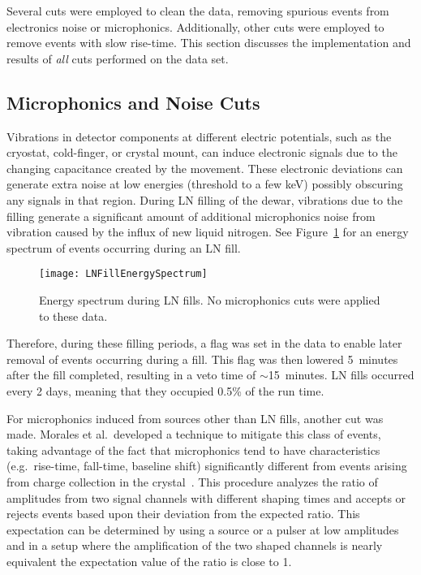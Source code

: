 	Several cuts were employed to clean the data, removing spurious events from electronics noise or microphonics.  Additionally, other cuts were employed to remove events with slow rise-time.  This section discusses the implementation and results of \emph{all} cuts performed on the data set.  
	
		\subsection{Microphonics and Noise Cuts}
	     	\label{sec:MicroCuts}	
	
	Vibrations in detector components at different electric potentials, such as the cryostat, cold-finger, or crystal mount, can induce electronic signals due to the changing capacitance created by the movement.  These electronic deviations can generate extra noise at low energies (threshold to a few keV) possibly obscuring any signals in that region.  During LN filling of the dewar, vibrations due to the filling generate a significant amount of additional microphonics noise from vibration caused by the influx of new liquid nitrogen.  See Figure~\ref{fig:BeGeLNExample} for an energy spectrum of events occurring during an LN fill.  
			\begin{figure}
				\centering
				\texttt{[image: LNFillEnergySpectrum]}
				\caption[Energy spectrum during LN fills]
				{Energy spectrum during LN fills.  No microphonics cuts were applied to these data.}
				\label{fig:BeGeLNExample}
			\end{figure}
Therefore, during these filling periods, a flag was set in the data to enable later removal of events occurring during a fill.  This flag was then lowered 5~minutes after the fill completed, resulting in a veto time of $\sim$15~minutes.  LN fills occurred every 2 days, meaning that they occupied 0.5\% of the run time.  
		
	For microphonics induced from sources other than LN fills, another cut was made.  Morales et al.~developed a technique to mitigate this class of events, taking advantage of the fact that microphonics tend to have characteristics (e.g.~rise-time, fall-time, baseline shift) significantly different from events arising from charge collection in the crystal~\cite{Morales1992410}.  This procedure analyzes the ratio of amplitudes from two signal channels with different shaping times  and accepts or rejects events based upon their deviation from the expected ratio.  This expectation can be determined by using a source or a pulser at low amplitudes and in a setup where the amplification of the two shaped channels is nearly equivalent the expectation value of the ratio is close to 1.  
	
